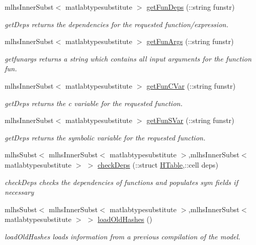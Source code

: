 \begin{DoxyCompactItemize}
mlhs\+Inner\+Subst$<$ matlabtypesubstitute $>$ \hyperlink{classamimodel_ab2be9a8b5a1467cc7c4a5bcd651c209e}{get\+Fun\+Deps} (\+::string funstr)
\begin{DoxyCompactList}\small\item\em get\+Deps returns the dependencies for the requested function/expression. \end{DoxyCompactList}\item 
mlhs\+Inner\+Subst$<$ matlabtypesubstitute $>$ \hyperlink{classamimodel_a47ece64d988c9c183782a94bd7de3e6b}{get\+Fun\+Args} (\+::string funstr)
\begin{DoxyCompactList}\small\item\em getfunargs returns a string which contains all input arguments for the function fun. \end{DoxyCompactList}\item 
mlhs\+Inner\+Subst$<$ matlabtypesubstitute $>$ \hyperlink{classamimodel_a12e6324d6137b28d7f4363aaf309c140}{get\+Fun\+C\+Var} (\+::string funstr)
\begin{DoxyCompactList}\small\item\em get\+Deps returns the c variable for the requested function. \end{DoxyCompactList}\item 
mlhs\+Inner\+Subst$<$ matlabtypesubstitute $>$ \hyperlink{classamimodel_a08bca7058280eace2b47d57ea04068ef}{get\+Fun\+S\+Var} (\+::string funstr)
\begin{DoxyCompactList}\small\item\em get\+Deps returns the symbolic variable for the requested function. \end{DoxyCompactList}\item 
mlhs\+Subst$<$ mlhs\+Inner\+Subst$<$ matlabtypesubstitute $>$,mlhs\+Inner\+Subst$<$ matlabtypesubstitute $>$ $>$ \hyperlink{classamimodel_aa04dcfc1d2188cae948a75ebd46a6e03}{check\+Deps} (\+::struct \hyperlink{classamimodel_aafe6335df413dd688a2f44efba012cf1}{H\+Table},\+::cell deps)
\begin{DoxyCompactList}\small\item\em check\+Deps checks the dependencies of functions and populates sym fields if necessary \end{DoxyCompactList}\item 
mlhs\+Subst$<$ mlhs\+Inner\+Subst$<$ matlabtypesubstitute $>$,mlhs\+Inner\+Subst$<$ matlabtypesubstitute $>$ $>$ \hyperlink{classamimodel_ab21f46296b0ee0a141c38143a79ad396}{load\+Old\+Hashes} ()
\begin{DoxyCompactList}\small\item\em load\+Old\+Hashes loads information from a previous compilation of the model. \end{DoxyCompactList}\item 

\end{DoxyCompactItemize}
